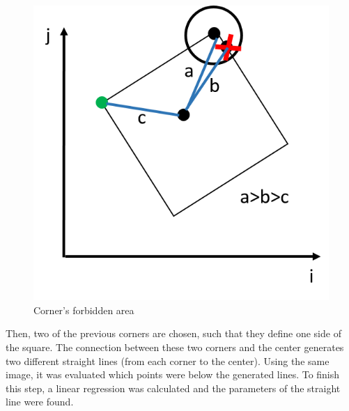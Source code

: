 \begin{figure}[H]
\centering
\includegraphics[scale=0.5]{figures/rotation6.png}
\caption{Corner's forbidden area}
\label{fig:corner}
\end{figure}

Then, two of the previous corners are chosen, such that they define one side of the square. The connection between these two corners and the center generates two different straight lines (from each corner to the center). Using the same image, it was evaluated which points were below the generated lines. To finish this step, a linear regression was calculated and the parameters of the straight line were found.

